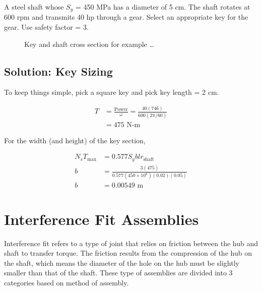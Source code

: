 \documentclass[a4paper,openany]{tufte-book}
\begin{document}
A steel shaft whose \(S_y\) = 450 MPa has a diameter of 5 cm. The shaft rotates at 600 rpm and transmits 40 hp through a gear. Select an appropriate key for the gear. Use safety factor = 3.

\begin{figure}[htbp]
  \centering
\caption{Key and shaft cross section for example \ldots{}}
\end{figure}

\subsection{Solution: Key Sizing}
\label{sec:org9a13556}

To keep things simple, pick a square key and pick key length = 2 cm.

\begin{align*}
  T &= \frac{\text{Power}}{\omega} = \frac{40(746)}{600(2\pi/60)} \\
    &= 475 \text{ N-m}
\end{align*}

For the width (and height) of the key section,

\begin{align*}
  N_{s} T_{\max} &= 0.577S_{y}blr_{\text{shaft}} \\
  b &= \frac{3(475)}{0.577(450 \times 10^{6})(0.02)(0.05)} \\
  b &= 0.00549 \text{ m}
\end{align*}

\section{Interference Fit Assemblies}
\label{sec:org07ff32e}

Interference fit refers to a type of joint that relies on friction between the hub and shaft to transfer torque. The friction results from the compression of the hub on the shaft, which means the diameter of the hole on the hub must be slightly smaller than that of the shaft. These type of assemblies are divided into 3 categories based on method of assembly.
\end{document}
